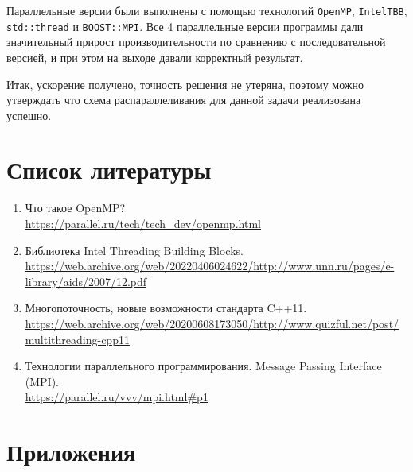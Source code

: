 \documentclass[12pt]{article}
\begin{document}
Параллельные версии были выполнены с помощью технологий \texttt{OpenMP}, \texttt{IntelTBB}, \texttt{std::thread} и \texttt{BOOST::MPI}. Все 4 параллельные версии программы дали значительный прирост производительности по сравнению с последовательной версией, и при этом на выходе давали корректный результат.

Итак, ускорение получено, точность решения не утеряна, поэтому можно утверждать что схема распараллеливания для данной задачи реализована успешно.

\newpage

\section{Список литературы}
\begin{enumerate}
\item Что такое OpenMP? \\ 
\url{https://parallel.ru/tech/tech_dev/openmp.html}
\item Библиотека Intel Threading Building Blocks. \\ 
\url{https://web.archive.org/web/20220406024622/http://www.unn.ru/pages/e-library/aids/2007/12.pdf}
\item Многопоточность, новые возможности стандарта C++11. \\ 
\url{https://web.archive.org/web/20200608173050/http://www.quizful.net/post/multithreading-cpp11}
\item Технологии параллельного программирования. Message Passing Interface (MPI). \\ 
\url{https://parallel.ru/vvv/mpi.html#p1}
\end{enumerate}

\newpage

\section{Приложения}
\end{document}
